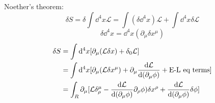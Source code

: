 \documentclass{article}
\newcommand{\lag}{\mathcal{L}}
\begin{document}
Noether's theorem:
$$\delta S=\delta\int\dd^4x\lag=\int(\delta\dd^4x)\lag+\int\dd^4x\delta\lag$$
$$\delta\dd^4x=\dd^4x(\partial_{\mu}\delta x^{\mu})$$
\begin{align*}
  \delta S&=\int\dd^4x[\partial_{\mu}(\lag\delta x)+\delta_0\lag]\\
  &=\int\dd^4x[\partial_{\mu}(\lag\delta x^{\mu})+\partial_{\mu}\dv{\lag}{(\partial_{\mu}\phi)}+\text{E-L eq terms}]\\
  &=\int_R\partial_{\mu}[\lag\delta^{\mu}_{\rho}-\dv{\lag}{(\partial_{\mu}\phi)}\partial_{\rho}\phi)\delta x^{\rho}+\dv{\lag}{(\partial_{\mu}\phi)}\delta \phi]
\end{align*}
\end{document}
